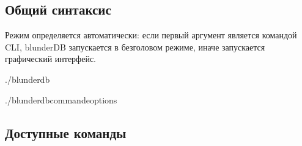 \documentclass[letterpaper,10pt,russian]{sphinxmanual}
\begin{document}
\subsection{Общий синтаксис}
\label{\detokenize{cli:syntaxe-generale}}
\sphinxAtStartPar
Режим определяется автоматически: если первый аргумент является командой CLI, blunderDB запускается в безголовом режиме, иначе запускается графический интерфейс.

\begin{sphinxVerbatim}[commandchars=\\\{\}]
./blunderdb

./blunderdb\PYGZlt{}commande\PYGZgt{}\PYG{o}{[}options\PYG{o}{]}
\end{sphinxVerbatim}


\subsection{Доступные команды}
\label{\detokenize{cli:commandes-disponibles}}
\end{document}
